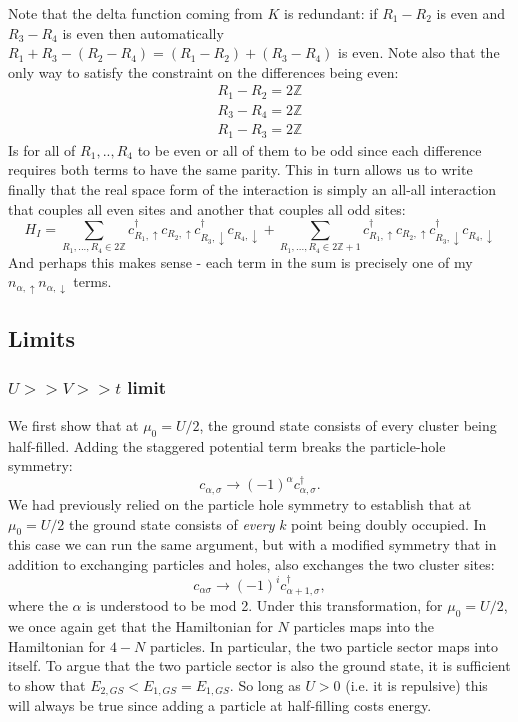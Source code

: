 \documentclass[12pt]{article}
\numberwithin{equation}{section}
\begin{document}
Note that the delta function coming from $K$ is redundant: if $R_1-R_2$ is even and $R_3-R_4$ is even then automatically $R_1+R_3-(R_2-R_4)=(R_1-R_2)+(R_3-R_4)$ is even. Note also that the only way to satisfy the constraint on the differences being even:
\begin{align}
    R_1-R_2=2\mathbb{Z}\\
    R_3-R_4=2\mathbb{Z}\\
    R_1-R_3=2\mathbb{Z}
\end{align}
Is for all of $R_1,..,R_4$ to be even or all of them to be odd since each difference requires both terms to have the same parity. This in turn allows us to write finally that the real space form of the interaction is simply an all-all interaction that couples all even sites and another that couples all odd sites:
\begin{equation}
    \boxed{
    H_I=\sum_{R_1,...,R_4\in 2\mathbb{Z}}
    c^\dagger_{R_1,\uparrow}c_{R_2,\uparrow}
    c^\dagger_{R_3,\downarrow}c_{R_4,\downarrow}
    +\sum_{R_1,...,R_4\in 2\mathbb{Z}+1}
    c^\dagger_{R_1,\uparrow}c_{R_2,\uparrow}
    c^\dagger_{R_3,\downarrow}c_{R_4,\downarrow}
    }
\end{equation}
And perhaps this makes sense - each term in the sum is precisely one of my $n_{\alpha,\uparrow} n_{\alpha,\downarrow}$ terms.


\subsection{Limits}
\subsubsection{$U>>V>>t$ limit}
We first show that at $\mu_0=U/2$, the ground state consists of every cluster being half-filled. Adding the staggered potential term breaks the particle-hole symmetry:
\begin{equation}
    c_{\alpha,\sigma}\to(-1)^{\alpha}c^\dagger_{\alpha,\sigma} .
\end{equation}
We had previously relied on the particle hole symmetry to establish that at $\mu_0=U/2$ the ground state consists of \textit{every} $k$ point being doubly occupied. In this case we can run the same argument, but with a modified symmetry that in addition to exchanging particles and holes, also exchanges the two cluster sites:
\begin{equation}
    c_{\alpha\sigma}\to(-1)^{i}c^\dagger_{\alpha+1,\sigma},
\end{equation} 
where the $\alpha$ is understood to be mod 2. Under this transformation, for $\mu_0=U/2$, we once again get that the Hamiltonian for $N$ particles maps into the Hamiltonian for $4-N$ particles. In particular, the two particle sector maps into itself. To argue that the two particle sector is also the ground state, it is sufficient to show that $E_{2,GS}<E_{1,GS}=E_{1,GS}$. So long as $U>0$ (i.e. it is repulsive) this will always be true since adding a particle at half-filling costs energy.
\end{document}
